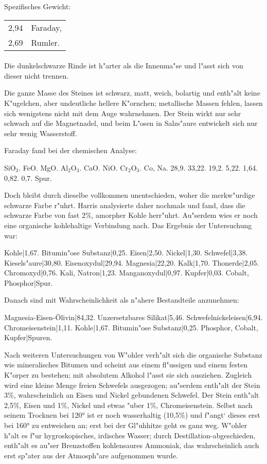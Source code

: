 \documentclass[a4paper, 11pt, oneside]{article}
\begin{document}
Spezifisches Gewicht:  
\begin{table}[!ht]
    \centering
    \begin{tabular}{l l}
        2,94 & Faraday,\\
        2,69 & Rumler.
    \end{tabular}
\end{table}
\paragraph{}
Die dunkelschwarze Rinde ist h"arter als die Innenma"se und l"asst sich von dieser nicht trennen.

Die ganze Masse des Steines ist schwarz, matt, weich, bolartig und enth"alt keine K"ugelchen, aber undeutliche hellere K"ornchen; metallische Massen fehlen, lassen sich wenigstens nicht mit dem Auge wahrnehmen. Der Stein wirkt nur sehr schwach auf die Magnetnadel, und beim L"osen in Salzs"aure entwickelt sich nur sehr wenig Wasserstoff.

Faraday fand bei der chemischen Analyse:

SiO$_{3}$. FeO. MgO. Al$_{2}$O$_{3}$. CaO. NiO. Cr$_{2}$O$_{3}$. Co, Na.  
28,9. 33,22. 19,2. 5,22. 1,64. 0,82. 0,7. Spur.

Doch bleibt durch dieselbe vollkommen unentschieden, woher die merkw"urdige schwarze Farbe r"uhrt. Harris analysierte daher nochmals und fand, dass die schwarze Farbe von fast 2\%, amorpher Kohle herr"uhrt. Au"serdem wies er noch eine organische kohlehaltige Verbindung nach. Das Ergebnis der Untersuchung war:

Kohle|1,67.  
Bitumin"ose Substanz|0,25.  
Eisen|2,50.  
Nickel|1,30.  
Schwefel|3,38.  
Kiesels"aure|30,80.  
Eisenoxydul|29,94.  
Magnesia|22,20.  
Kalk|1,70.  
Thonerde|2,05.  
Chromoxyd|0,76.  
Kali, Natron|1,23.  
Manganoxydul|0,97.  
Kupfer|0,03.  
Cobalt, Phosphor|Spur.

Danach sind mit Wahrscheinlichkeit als n"ahere Bestandteile anzunehmen:

Magnesia-Eisen-Ölivin|84,32.  
Unzersetzbares Silikat|5,46.  
Schwefelnickeleisen|6,94.  
Chromeisenstein|1,11.  
Kohle|1,67.  
Bitumin"ose Substanz|0,25.  
Phosphor, Cobalt, Kupfer|Spuren.

Nach weiteren Untersuchungen von W"ohler verh"alt sich die organische Substanz wie mineralisches Bitumen und scheint aus einem fl"ussigen und einem festen K"orper zu bestehen; mit absolutem Alkohol l"asst sie sich ausziehen. Zugleich wird eine kleine Menge freien Schwefels ausgezogen; au"serdem enth"alt der Stein 3\%, wahrscheinlich an Eisen und Nickel gebundenen Schwefel. Der Stein enth"alt 2,5\%, Eisen und 1\%, Nickel und etwas "uber 1\%, Chromeisenstein. Selbst nach seinem Trocknen bei 120° ist er noch wasserhaltig (10,5\%) und f"angt‘ dieses erst bei 160° zu entweichen an; erst bei der Gl"uhhitze geht es ganz weg. W"ohler h"alt es f"ur hygroskopisches, irdisches Wasser; durch Destillation-abgeschieden‚ enth"alt es au"ser Brenzstoffen kohlensaures Ammoniak, das wahrscheinlich auch erst sp"ater aus der Atmosph"are aufgenommen wurde.
\end{document}
